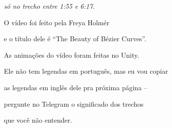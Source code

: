 \documentclass[oneside,12pt]{article}
\begin{document}
{\sl só no trecho entre 1:55 e 6:17.}

\msk

O vídeo foi feito pela Freya Holmér

e o título dele é ``The Beauty of Bézier Curves''.

As animações do vídeo foram feitas no Unity.

\msk

Ele não tem legendas em português, mas eu vou copiar

as legendas em inglês dele pra próxima página --

pergunte no Telegram o significado dos trechos

que você não entender.

\newpage



\long{}
\end{document}
